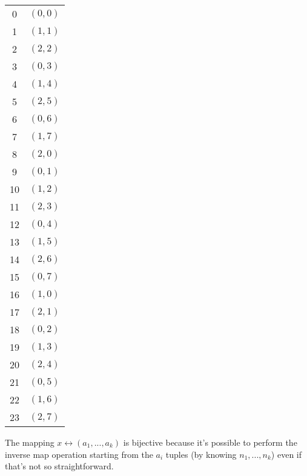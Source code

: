 \begin{center}
    \begin{tabular}{|c|c|}
        \hline
        0&$(0,0)$\\
        1&$(1,1)$\\
        2&$(2,2)$\\
        3&$(0,3)$\\
        4&$(1,4)$\\
        5&$(2,5)$\\
        6&$(0,6)$\\
        7&$(1,7)$\\
        8&$(2,0)$\\
        9&$(0,1)$\\
        10&$(1,2)$\\
        11&$(2,3)$\\
        12&$(0,4)$\\
        13&$(1,5)$\\
        14&$(2,6)$\\
        15&$(0,7)$\\
        16&$(1,0)$\\
        17&$(2,1)$\\
        18&$(0,2)$\\
        19&$(1,3)$\\
        20&$(2,4)$\\
        21&$(0,5)$\\
        22&$(1,6)$\\
        23&$(2,7)$\\
        \hline
    \end{tabular}
\end{center}
The mapping $x\leftrightarrow(a_1,...,a_k)$ is bijective because it's possible to perform the inverse map operation starting from the $a_i$ tuples (by knowing $n_1,...,n_k$) even if that's not so straightforward.

